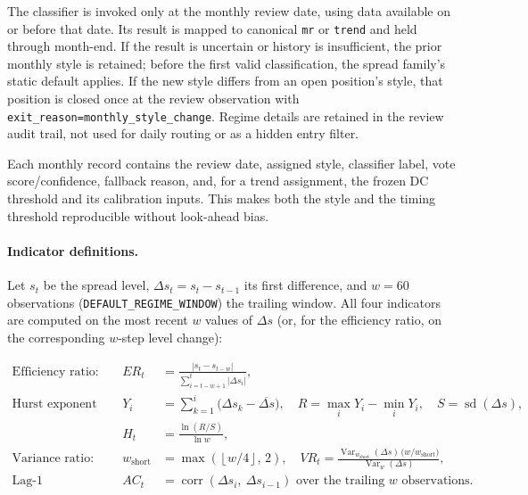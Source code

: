 The classifier is invoked only at the monthly review date, using data available on
or before that date. Its result is mapped to canonical \texttt{mr} or \texttt{trend}
and held through month-end. If the result is uncertain or history is insufficient,
the prior monthly style is retained; before the first valid classification, the
spread family's static default applies. If the new style differs from an open
position's style, that position is closed once at the review observation with
\texttt{exit\_reason=monthly\_style\_change}. Regime details are retained in the review
audit trail, not used for daily routing or as a hidden entry filter.

Each monthly record contains the review date, assigned style, classifier label,
vote score/confidence, fallback reason, and, for a trend assignment, the frozen DC
threshold and its calibration inputs. This makes both the style and the timing
threshold reproducible without look-ahead bias.

\paragraph{Indicator definitions.} Let $s_t$ be the spread level, $\Delta s_t = s_t -
s_{t-1}$ its first difference, and $w=60$ observations (\texttt{DEFAULT\_REGIME\_WINDOW})
the trailing window. All four indicators are computed on the most recent $w$ values of
$\Delta s$ (or, for the efficiency ratio, on the corresponding $w$-step level change):

\begin{equation}
\begin{aligned}
\text{Efficiency ratio: } && ER_t &= \frac{\left|s_t - s_{t-w}\right|}{\displaystyle\sum_{i=t-w+1}^{t} \left|\Delta s_i\right|}, \\[4pt]
\text{Hurst exponent (single-scale R/S): } && Y_i &= \sum_{k=1}^{i}\bigl(\Delta s_k - \overline{\Delta s}\bigr),\quad
R = \max_i Y_i - \min_i Y_i,\quad S = \operatorname{sd}(\Delta s), \\
&& H_t &= \frac{\ln(R/S)}{\ln w}, \\[4pt]
\text{Variance ratio: } && w_{\mathrm{short}} &= \max\!\left(\left\lfloor w/4\right\rfloor,\,2\right),\quad
VR_t = \frac{\operatorname{Var}_{w_{\mathrm{short}}}(\Delta s)\,\bigl(w / w_{\mathrm{short}}\bigr)}{\operatorname{Var}_{w}(\Delta s)}, \\[4pt]
\text{Lag-1 autocorrelation: } && AC_t &= \operatorname{corr}\!\left(\Delta s_i,\ \Delta s_{i-1}\right) \text{ over the trailing } w \text{ observations}.
\end{aligned}
\end{equation}

